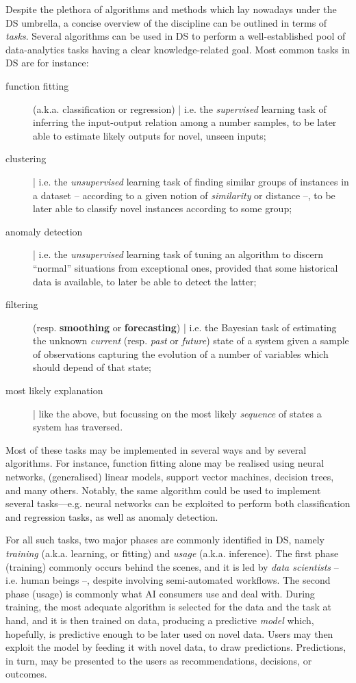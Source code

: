 \documentclass[12pt,a4paper,openright,twoside]{book}
\begin{document}
Despite the plethora of algorithms and methods which lay nowadays under the DS umbrella, a concise overview of the discipline can be outlined in terms of \emph{tasks}.
%
Several algorithms can be used in DS to perform a well-established pool of data-analytics tasks having a clear knowledge-related goal.
%
Most common tasks in DS are for instance:
%
\begin{description}
    \item[function fitting] (a.k.a. classification or regression) | i.e. the \emph{supervised} learning task of inferring the input-output relation among a number samples, to be later able to estimate likely outputs for novel, unseen inputs;
    \item[clustering] | i.e. the \emph{unsupervised} learning task of finding similar groups of instances in a dataset -- according to a given notion of \emph{similarity} or distance --, to be later able to classify novel instances according to some group;
    \item[anomaly detection] | i.e. the \emph{unsupervised} learning task of tuning an algorithm to discern ``normal'' situations from exceptional ones, provided that some historical data is available, to later be able to detect the latter;
    \item[filtering] (resp. \textbf{smoothing} or \textbf{forecasting}) | i.e. the Bayesian task of estimating the unknown \emph{current} (resp. \emph{past} or \emph{future}) state of a system given a sample of observations capturing the evolution of a number of variables which should depend of that state;  
    \item[most likely explanation] | like the above, but focussing on the most likely \emph{sequence} of states a system has traversed.
\end{description}
%
Most of these tasks may be implemented in several ways and by several algorithms.
%
For instance, function fitting alone may be realised using neural networks, (generalised) linear models, support vector machines, decision trees, and many others.
%
Notably, the same algorithm could be used to implement several tasks---e.g. neural networks can be exploited to perform both classification and regression tasks, as well as anomaly detection.

For all such tasks, two major phases are commonly identified in DS, namely \emph{training} (a.k.a. learning, or fitting) and \emph{usage} (a.k.a. inference).
%
The first phase (training) commonly occurs behind the scenes, and it is led by \emph{data scientists} -- i.e. human beings --, despite involving semi-automated workflows.
%
The second phase (usage) is commonly what AI consumers use and deal with.
%
During training, the most adequate algorithm is selected for the data and the task at hand, and it is then trained on data, producing a predictive \emph{model} which, hopefully, is predictive enough to be later used on novel data.
%
Users may then exploit the model by feeding it with novel data, to draw predictions.
%
Predictions, in turn, may be presented to the users as recommendations, decisions, or outcomes.
\end{document}
